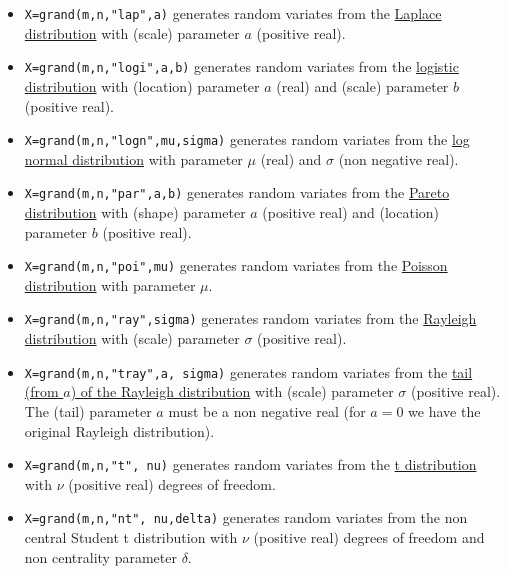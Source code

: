 \begin{enumerate}
\begin{itemize}
\item {} 
  \verb!X=grand(m,n,"lap",a)! generates random variates from the \hyperlink{lappdf}{Laplace 
  distribution} with (scale) parameter $a$ (positive real).
  
\item {} 
  \verb!X=grand(m,n,"logi",a,b)! generates random variates from the \hyperlink{logipdf}{logistic 
  distribution} with (location) parameter $a$ (real) and (scale) parameter $b$ (positive real).
  
\item {} 
  \verb!X=grand(m,n,"logn",mu,sigma)! generates random variates from the  \hyperlink{lognpdf}{log normal
  distribution} with parameter $\mu$ (real) and  $\sigma$ (non negative real).
  
\item {} 
  \verb!X=grand(m,n,"par",a,b)! generates random variates from the  \hyperlink{parpdf}{Pareto 
  distribution} with (shape) parameter $a$ (positive real) and (location) parameter $b$ (positive real).

\item {} \verb!X=grand(m,n,"poi",mu)! generates random
  variates from the \hyperlink{poipdf}{Poisson distribution} with parameter $\mu$. 
  
\item {} 
  \verb!X=grand(m,n,"ray",sigma)! generates random variates from the  \hyperlink{raypdf}{Rayleigh 
  distribution} with (scale) parameter $\sigma$ (positive real).
  
\item {} 
  \verb!X=grand(m,n,"tray",a, sigma)! generates random variates from the
  \hyperlink{traypdf}{tail (from $a$) of the Rayleigh distribution} with (scale) parameter 
  $\sigma$ (positive real). The (tail) parameter $a$ must be a non negative
  real (for $a=0$ we have the original Rayleigh distribution).

\item {} 
  \verb!X=grand(m,n,"t", nu)! generates random variates from the  \hyperlink{tpdf}{t distribution} 
  with $\nu$ (positive real) degrees of freedom. 

\item {} 
  \verb!X=grand(m,n,"nt", nu,delta)! generates random variates from the non central Student t distribution
  with $\nu$ (positive real) degrees of freedom and non centrality parameter $\delta$. 


\end{itemize}
\end{enumerate}
